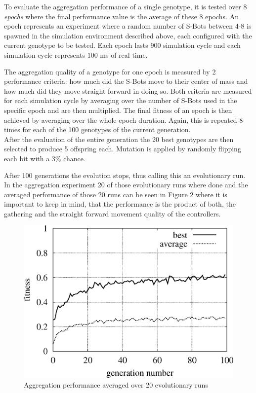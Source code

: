 To evaluate the aggregation performance of a single genotype, it is tested over
8 \textit{epochs} where the final performance value is the average of these
8 epochs. An epoch represents an experiment where a random number of S-Bots
between 4-8 is spawned in the simulation environment described above, each
configured with the current genotype to be tested. Each epoch lasts 900
simulation cycle and each simulation cycle represents 100 ms of real time.

The aggregation quality of a genotype for one epoch is measured by 2
performance criteria: how much did the S-Bots move to their center
of mass and how much did they move straight forward in doing so. Both criteria
are measured for each simulation cycle by averaging over the number of S-Bots
used in the specific epoch and are then multiplied. The final fitness of an
epoch is then achieved by averaging over the whole epoch duration. Again,
this is repeated 8 times for each of the 100 genotypes of the current
generation.
\ \\

After the evaluation of the entire generation the 20 best genotypes are then
selected to produce 5 offspring each. Mutation is applied by randomly flipping each bit with a
3\% chance.

After 100 generations the evolution stops, thus calling this an evolutionary
run. In the aggregation experiment 20 of those evolutionary runs where done
and the averaged performance of those 20 runs can be seen in Figure 2 where
it is important to keep in mind, that the performance is the product of both,
the gathering and the straight forward movement quality of the controllers.
\ \\

\begin{figure}[]
  \centering
    \includegraphics[width=0.6\linewidth]{pics/03.png}
  \caption{Aggregation performance averaged over 20 evolutionary runs}
  \label{}
\end{figure}

